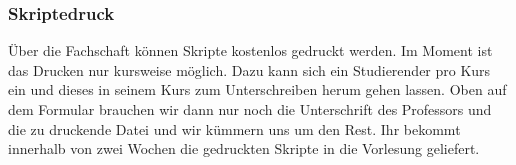 \subsubsection{Skriptedruck}
Über die Fachschaft können Skripte kostenlos gedruckt werden. 
Im Moment ist das Drucken nur kursweise möglich. Dazu kann sich 
ein Studierender pro Kurs ein   und dieses in seinem Kurs zum Unterschreiben 
herum gehen lassen. Oben auf dem Formular brauchen wir dann nur 
noch die Unterschrift des Professors und die zu druckende Datei und 
wir kümmern uns um den Rest. Ihr bekommt innerhalb von zwei 
Wochen die gedruckten Skripte in die Vorlesung geliefert. 